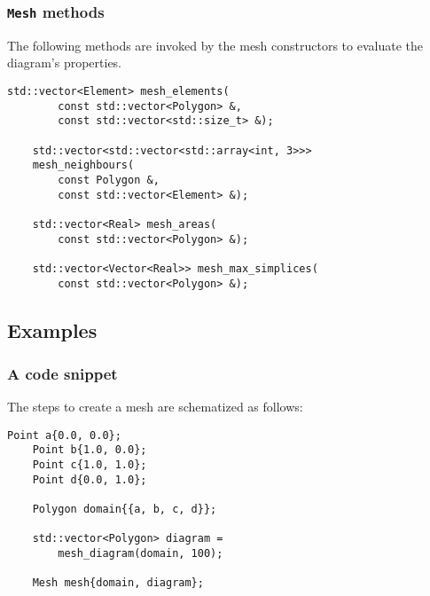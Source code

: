 \begin{frame}[fragile]
    \frametitle{\lstinline{Mesh} methods}

    The following methods are invoked by the mesh constructors to evaluate the diagram's properties.

    \begin{lstlisting}[style=cpp]
    std::vector<Element> mesh_elements(
        const std::vector<Polygon> &, 
        const std::vector<std::size_t> &);

    std::vector<std::vector<std::array<int, 3>>> 
    mesh_neighbours(
        const Polygon &, 
        const std::vector<Element> &);

    std::vector<Real> mesh_areas(
        const std::vector<Polygon> &);

    std::vector<Vector<Real>> mesh_max_simplices(
        const std::vector<Polygon> &);
    \end{lstlisting}

\end{frame}

\subsection{Examples}

\begin{frame}[fragile]
    \frametitle{A code snippet}

    The steps to create a mesh are schematized as follows:

    \begin{lstlisting}[style=cpp]
    Point a{0.0, 0.0};
    Point b{1.0, 0.0};
    Point c{1.0, 1.0};
    Point d{0.0, 1.0};

    Polygon domain{{a, b, c, d}};

    std::vector<Polygon> diagram = 
        mesh_diagram(domain, 100);
    
    Mesh mesh{domain, diagram};
    \end{lstlisting}

\end{frame}

